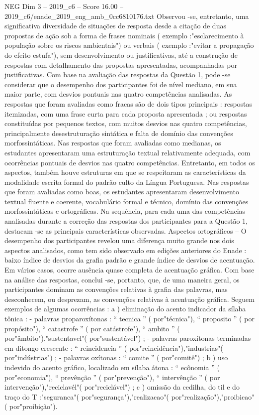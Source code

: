 \begin{textsample}{NEG Dim 3 – 2019\_c6 – Score 16.00 – 2019\_c6/enade\_2019\_eng\_amb\_0cc6810176.txt}
Observou -se, entretanto, uma significativa diversidade de situações de resposta desde a citação de duas propostas de ação sob a forma de frases nominais ( exemplo :"esclarecimento à população sobre os riscos ambientais") ou verbais ( exemplo :"evitar a propagação do efeito estufa"), sem desenvolvimento ou justificativas, até a construção de respostas com detalhamento das propostas apresentadas, acompanhadas por justificativas.
Com base na avaliação das respostas da Questão 1, pode -se considerar que o desempenho dos participantes foi de nível mediano, em sua maior parte, com desvios pontuais nas quatro competências analisadas.
As respostas que foram avaliadas como fracas são de dois tipos principais : respostas itemizadas, com uma frase curta para cada proposta apresentada ; ou respostas constituídas por pequenos textos, com muitos desvios nas quatro competências, principalmente desestruturação sintática e falta de domínio das convenções morfossintáticas.
Nas respostas que foram avaliadas como medianas, os estudantes apresentaram uma estruturação textual relativamente adequada, com ocorrências pontuais de desvios nas quatro competências.
Entretanto, em todos os aspectos, também houve estruturas em que se respeitaram as características da modalidade escrita formal do padrão culto da Língua Portuguesa.
Nas respostas que foram avaliadas como boas, os estudantes apresentaram desenvolvimento textual fluente e coerente, vocabulário formal e técnico, domínio das convenções morfossintáticas e ortográficas.
Na sequência, para cada uma das competências analisadas durante a correção das respostas dos participantes para a Questão 1, destacam -se as principais características observadas.
Aspectos ortográficos – O desempenho dos participantes revelou uma diferença muito grande nos dois aspectos analisados, como tem sido observado em edições anteriores do Enade : baixo índice de desvios da grafia padrão e grande índice de desvios de acentuação.
Em vários casos, ocorre ausência quase completa de acentuação gráfica.
Com base na análise das respostas, conclui -se, portanto, que, de uma maneira geral, os participantes dominam as convenções relativas à grafia das palavras, mas desconhecem, ou desprezam, as convenções relativas à acentuação gráfica.
Seguem exemplos de algumas ocorrências : a ) eliminação do acento indicador da sílaba tônica : - palavras proparoxítonas : “ tecnica ” ( por"técnica"), “ proposito ” ( por propósito"), “ catastrofe ” ( por catástrofe"), “ ambito ” ( por"âmbito"),"sustentavel"( por"sustentável") ; - palavras paroxítonas terminadas em ditongo crescente : “ reincidencia ” ( por"reincidência"),"industrias"( por"indústrias") ; - palavras oxítonas : “ comite ” ( por"comitê") ; b ) uso indevido do acento gráfico, localizado em sílaba átona : “ ecônomia ” ( por"economia"), “ prevênção ” ( por"prevenção"), “ intervênção ” ( por intervenção"),"reciclavél"( por"reciclável") ; c ) omissão da cedilha, do til e do traço do T :"seguranca"( por"segurança"),"realizacao"( por"realização"),"proibicao"( por"proibição").

\end{textsample}
